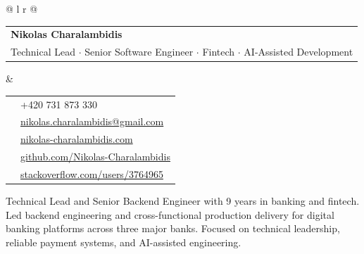 \documentclass[10pt]{article}
\begin{document}

\begin{tabular*}{\textwidth}{@{\extracolsep{\fill}} l r @{}}
  \begin{tabular}[b]{@{}l@{}}
    {\sffamily\Huge\textbf{Nikolas Charalambidis}} \\[10pt]
    {\normalsize Technical Lead $\cdot$ Senior Software Engineer $\cdot$ Fintech $\cdot$ AI-Assisted Development}
  \end{tabular} &
  \footnotesize
  \begin{tabular}[b]{@{}ll@{}}
    \faPhone & +420 731 873 330 \\
    \faEnvelope & \href{mailto:nikolas.charalambidis@gmail.com}{nikolas.charalambidis@gmail.com} \\
    \faGlobe & \href{https://www.nikolas-charalambidis.com/}{nikolas-charalambidis.com} \\
    \faGithub & \href{https://github.com/Nikolas-Charalambidis}{github.com/Nikolas-Charalambidis} \\
    \faStackOverflow & \href{https://stackoverflow.com/users/3764965}{stackoverflow.com/users/3764965} \\
  \end{tabular}
\end{tabular*}

\vspace{0.2cm}

\small
Technical Lead and Senior Backend Engineer with 9 years in banking and fintech. Led backend engineering and
cross-functional production delivery for digital banking platforms across three major banks. Focused on technical
leadership, reliable payment systems, and AI-assisted engineering.
\end{document}
